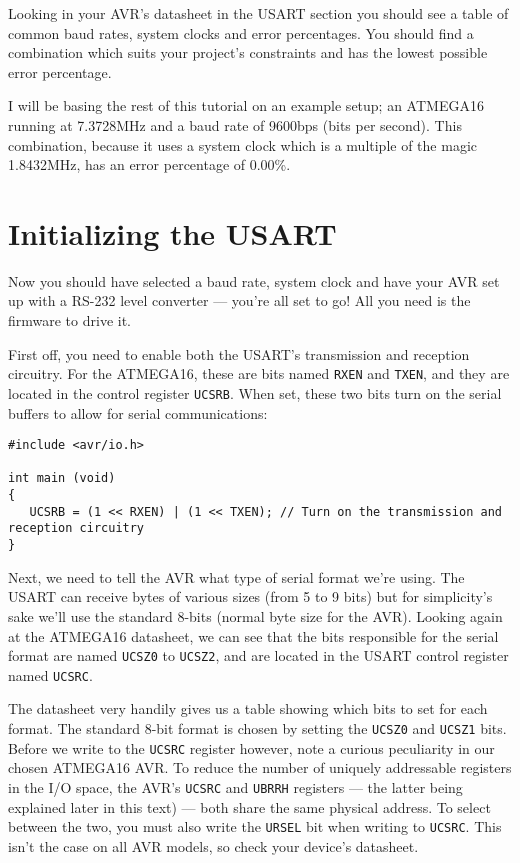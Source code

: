\documentclass[a4paper,oneside,notitlepage]{book}
\begin{document}
Looking in your AVR's datasheet in the USART section you should see a table of common baud rates, system clocks and error percentages. You should find a combination which suits your project's constraints and has the lowest possible error percentage.

I will be basing the rest of this tutorial on an example setup; an ATMEGA16 running at 7.3728MHz and a baud rate of 9600bps (bits per second). This combination, because it uses a system clock which is a multiple of the magic 1.8432MHz, has an error percentage of 0.00\%.


\chapter{Initializing the USART}

Now you should have selected a baud rate, system clock and have your AVR set up with a RS-232 level converter --- you're all set to go! All you need is the firmware to drive it.

First off, you need to enable both the USART's transmission and reception circuitry. For the ATMEGA16, these are bits named \texttt{RXEN} and \texttt{TXEN}, and they are located in the control register \texttt{UCSRB}. When set, these two bits turn on the serial buffers to allow for serial communications:

\begin{center}
\begin{lstlisting}
#include <avr/io.h>

int main (void)
{
   UCSRB = (1 << RXEN) | (1 << TXEN); // Turn on the transmission and reception circuitry
}
\end{lstlisting}
\end{center}

Next, we need to tell the AVR what type of serial format we're using. The USART can receive bytes of various sizes (from 5 to 9 bits) but for simplicity's sake we'll use the standard 8-bits (normal byte size for the AVR). Looking again at the ATMEGA16 datasheet, we can see that the bits responsible for the serial format are named \texttt{UCSZ0} to \texttt{UCSZ2}, and are located in the USART control register named \texttt{UCSRC}.

The datasheet very handily gives us a table showing which bits to set for each format. The standard 8-bit format is chosen by setting the \texttt{UCSZ0} and \texttt{UCSZ1} bits. Before we write to the \texttt{UCSRC} register however, note a curious peculiarity in our chosen ATMEGA16 AVR. To reduce the number of uniquely addressable registers in the I/O space, the AVR's \texttt{UCSRC} and \texttt{UBRRH} registers --- the latter being explained later in this text) --- both share the same physical address. To select between the two, you must also write the \texttt{URSEL} bit when writing to \texttt{UCSRC}. This isn't the case on all AVR models, so check your device's datasheet.
\end{document}
